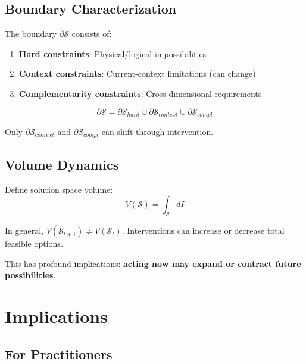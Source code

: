 \subsection{Boundary Characterization}

The boundary $\partial \mathcal{S}$ consists of:
\begin{enumerate}
    \item \textbf{Hard constraints}: Physical/logical impossibilities
    \item \textbf{Context constraints}: Current-context limitations (can change)
    \item \textbf{Complementarity constraints}: Cross-dimensional requirements
\end{enumerate}

\begin{equation}
\partial \mathcal{S} = \partial \mathcal{S}_{hard} \cup \partial \mathcal{S}_{context} \cup \partial \mathcal{S}_{compl}
\end{equation}

Only $\partial \mathcal{S}_{context}$ and $\partial \mathcal{S}_{compl}$ can shift through intervention.

\subsection{Volume Dynamics}

Define solution space volume:
\begin{equation}
V(\mathcal{S}) = \int_{\mathcal{S}} dI
\end{equation}

\begin{proposition}
In general, $V(\mathcal{S}_{t+1}) \neq V(\mathcal{S}_t)$. Interventions can increase or decrease total feasible options.
\end{proposition}

This has profound implications: \textbf{acting now may expand or contract future possibilities}.

\section{Implications}
\label{sec:ss-implications}

\subsection{For Practitioners}


